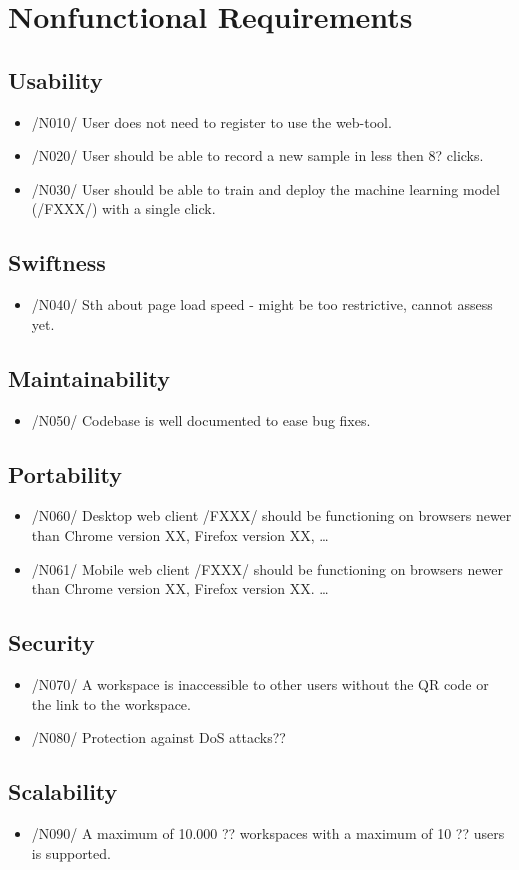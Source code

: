 \section{Nonfunctional Requirements}
\subsection{Usability}
\begin{itemize}
    \item /N010/ User does not need to register to use the web-tool.
    \item /N020/ User should be able to record a new sample in less then 8? clicks. %
    \item /N030/ User should be able to train and deploy the machine learning model (/FXXX/) with a single click.
\end{itemize}
\subsection{Swiftness}
\begin{itemize}
    \item /N040/ Sth about page load speed - might be too restrictive, cannot assess yet.
\end{itemize}
\subsection{Maintainability}
\begin{itemize}
    \item /N050/ Codebase is well documented to ease bug fixes.
\end{itemize}
\subsection{Portability}
\begin{itemize}
    \item /N060/ Desktop web client /FXXX/ should be functioning on browsers newer than Chrome version XX, Firefox version XX, \dots
    \item /N061/ Mobile web client /FXXX/  should be functioning on browsers newer than Chrome version XX, Firefox version XX. \dots
\end{itemize}
\subsection{Security}
\begin{itemize}
    \item /N070/ A workspace is inaccessible to other users without the QR code or the link to the workspace.
    \item /N080/ Protection against DoS attacks??
\end{itemize}
\subsection{Scalability}
\begin{itemize}
    \item /N090/ A maximum of 10.000 ?? workspaces with a maximum of 10 ?? users is supported. 
\end{itemize}

